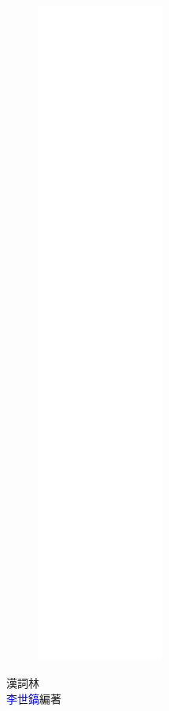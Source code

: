 \documentclass[a5paper,12pt]{memoir}
\begin{document}
\linespread{1.25}
\begin{figure}
\includegraphics[height=220mm]{cover.png}
\end{figure}
\hfill
\vfill
{\HUGE\textcolor{deepblue}{漢詞林}}\\
{\textcolor{blue}{李世鎬}\hspace{14pt}編著}
\vspace{64pt}
\frontmatter
\newpage
\addtolength{\topmargin}{20mm}
\linespread{1.25}

\mainmatter
\linespread{1.17}
\begin{multicols}{3}

\end{multicols}
\appendix
\newpage
\biblography
\end{document}
